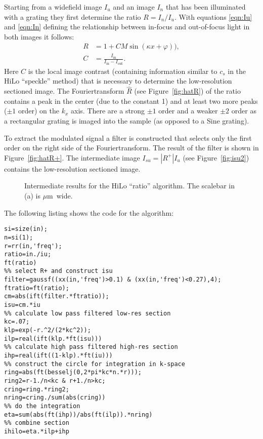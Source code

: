 \documentclass[11pt,abstracton,titlepage]{scrartcl}
\newcommand{\abs}[1]{\left| #1 \right|}
\newcommand{\figref}[1]{Figure~\ref{#1}}
\begin{document}
Starting from a widefield image $I_u$ and an image $I_n$ that has been
illuminated with a grating they first determine the ratio $R=I_n/I_u$.
With equations \eqref{eqn:Iu} and \eqref{eqn:In} defining the
relationship between in-focus and out-of-focus light in both images it
follows:
\begin{align}
  R&=1+CM\sin(\kappa x+\varphi)),\\
  C&=\frac{I_\textrm{in}}{I_\textrm{in}-I_\textrm{out}}.
\end{align}
Here $C$ is the local image contrast (containing information similar
to $c_s$ in the HiLo ``speckle'' method) that is necessary to
determine the low-resolution sectioned image. The Fouriertransform
$\hat R$ (see \figref{fig:hatR}) of the ratio contains a peak in the
center (due to the constant 1) and at least two more peaks ($\pm 1$
order) on the $k_x$ axis. There are a strong $\pm 1$ order and a
weaker $\pm 2$ order as a rectangular grating is imaged into the
sample (as opposed to a Sine grating).

To extract the modulated signal a filter is constructed that selects
only the first order on the right side of the Fouriertransform. The
result of the filter is shown in \figref{fig:hatR+}. The intermediate
image $I_{su}=\abs{R^+}I_u$ (see \figref{fig:isu2}) contains the
low-resolution sectioned image.

\begin{figure}[htb]
  \centering {}
  \caption{Intermediate results for the HiLo ``ratio'' algorithm. The scalebar in (a) is \unit[2]{$\mu$m} wide.}
  \label{fig:hilo2}
\end{figure}

The following listing shows the code for the algorithm:
\begin{lstlisting}
si=size(in);
n=si(1);
r=rr(in,'freq');
ratio=in./iu;
ft(ratio)
%% select R+ and construct isu
filter=gaussf((xx(in,'freq')>0.1) & (xx(in,'freq')<0.27),4);
ftratio=ft(ratio);
cm=abs(ift(filter.*ftratio));
isu=cm.*iu
%% calculate low pass filtered low-res section
kc=.07;
klp=exp(-r.^2/(2*kc^2));
ilp=real(ift(klp.*ft(isu)))
%% calculate high pass filtered high-res section
ihp=real(ift((1-klp).*ft(iu)))
%% construct the circle for integration in k-space
ring=abs(ft(besselj(0,2*pi*kc*n.*r)));
ring2=r-1./n<kc & r+1./n>kc;
cring=ring.*ring2;
nring=cring./sum(abs(cring))
%% do the integration
eta=sum(abs(ft(ihp))/abs(ft(ilp)).*nring)
%% combine section
ihilo=eta.*ilp+ihp
\end{lstlisting}
\end{document}
